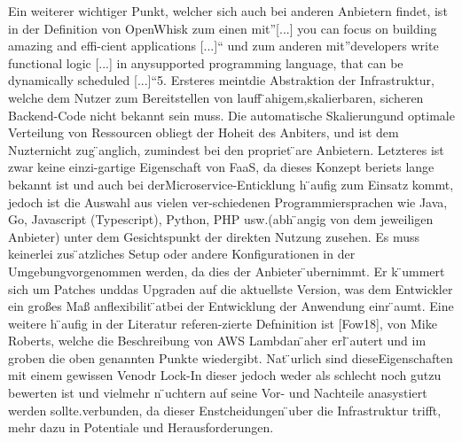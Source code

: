 Ein  weiterer  wichtiger  Punkt,  welcher  sich  auch  bei  anderen  Anbietern  findet,  ist  in  der Definition von OpenWhisk zum einen mit”[...]  you can focus on building amazing and effi-cient applications [...]“  und zum anderen mit”developers write functional logic [...]  in anysupported programming language, that can be dynamically scheduled [...]“5.  Ersteres meintdie  Abstraktion  der  Infrastruktur,  welche  dem  Nutzer  zum  Bereitstellen  von  lauff ̈ahigem,skalierbaren, sicheren Backend-Code nicht bekannt sein muss.  Die automatische Skalierungund optimale Verteilung von Ressourcen obliegt der Hoheit des Anbiters, und ist dem Nuzternicht  zug ̈anglich,  zumindest  bei  den  propriet ̈are  Anbietern.   Letzteres  ist  zwar  keine  einzi-gartige Eigenschaft von FaaS, da dieses Konzept beriets lange bekannt ist und auch bei derMicroservice-Enticklung h ̈aufig zum Einsatz kommt,  jedoch ist die Auswahl aus vielen ver-schiedenen Programmiersprachen wie Java, Go, Javascript (Typescript), Python, PHP usw.(abh ̈angig von dem jeweiligen Anbieter) unter dem Gesichtspunkt der direkten Nutzung zusehen.  Es muss keinerlei zus ̈atzliches Setup oder andere Konfigurationen in der Umgebungvorgenommen werden, da dies der Anbieter   ̈ubernimmt.  Er k ̈ummert sich um Patches unddas Upgraden auf die aktuellste Version,  was dem Entwickler ein großes Maß anflexibilit ̈atbei der Entwicklung der Anwendung einr ̈aumt.  Eine weitere h ̈aufig in der Literatur referen-zierte Defninition ist [Fow18], von Mike Roberts, welche die Beschreibung von AWS Lambdan ̈aher erl ̈autert und im groben die oben genannten Punkte wiedergibt.  Nat ̈urlich sind dieseEigenschaften mit einem gewissen Venodr Lock-In dieser jedoch weder als schlecht noch gutzu bewerten ist und vielmehr n ̈uchtern auf seine Vor- und Nachteile anasystiert werden sollte.verbunden,  da dieser Enstcheidungen   ̈uber die Infrastruktur trifft,  mehr dazu in Potentiale und Herausforderungen.

